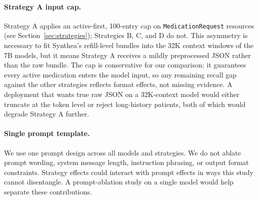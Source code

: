 \paragraph{Strategy A input cap.}
Strategy A applies an active-first, 100-entry cap on \texttt{MedicationRequest}
resources (see Section~\ref{sec:strategies}); Strategies B, C, and D do not.
This asymmetry is necessary to fit Synthea's refill-level bundles into the 32K
context windows of the 7B models, but it means Strategy A receives a mildly
preprocessed JSON rather than the raw bundle. The cap is conservative for our
comparison: it guarantees every active medication enters the model input, so any
remaining recall gap against the other strategies reflects format effects, not
missing evidence. A deployment that wants true raw JSON on a 32K-context model
would either truncate at the token level or reject long-history patients, both of
which would degrade Strategy A further.

\paragraph{Single prompt template.}
We use one prompt design across all models and strategies. We do not ablate prompt
wording, system message length, instruction phrasing, or output format constraints.
Strategy effects could interact with prompt effects in ways this study cannot disentangle.
A prompt-ablation study on a single model would help separate these contributions.

